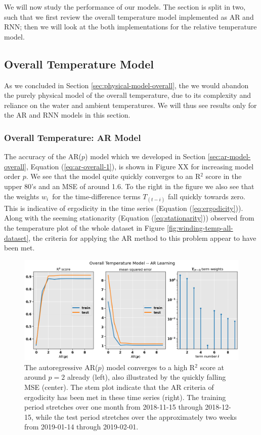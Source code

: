 \documentclass[]{article}
\begin{document}

We will now study the performance of our models. The section is split in two, such that we first review the overall temperature model implemented as AR and RNN; then we will look at the both implementations for the relative temperature model.

\subsection{Overall Temperature Model} \label{sec:results-overall}
As we concluded in Section \ref{sec:physical-model-overall}, the we would abandon the purely physical model of the overall temperature, due to its complexity and reliance on the water and ambient temperatures. We will thus see results only for the AR and RNN models in this section.

\subsubsection{Overall Temperature: AR Model} \label{sec:results-overall-ar}
The accuracy of the AR($p$) model which we developed in Section \ref{sec:ar-model-overall}, Equation (\ref{eq:ar-overall-1}), is shown in Figure XX for increasing model order $p$. We see that the model quite quickly converges to an R$^2$ score in the upper 80's and an MSE of around 1.6. To the right in the figure we also see that the weights $w_i$ for the time-difference terms $T_{(t-i)}$ fall quickly towards zero. This is indicative of ergodicity in the time series (Equation (\ref{eq:ergodicity})). Along with the seeming stationarity (Equation (\ref{eq:stationarity})) observed from the temperature plot of the whole dataset in Figure \ref{fig:winding-temp-all-dataset}, the criteria for applying the AR method to this problem appear to have been met. 

\begin{figure}[!h]
	\centering
	\includegraphics[width=1\linewidth]{./figs/ar-model-learning.png}
	\caption{The autoregressive AR($p$) model converges to a high R$^2$ score at around $p = 2$ already (left), also illustrated by the quickly falling MSE (center). The stem plot indicate that the AR criteria of ergodicity has been met in these time series (right). The training period stretches over one month from 2018-11-15 through 2018-12-15, while the test period stretches over the approximately two weeks from 2019-01-14 through 2019-02-01.}
	\label{fig:ar-model-learning}
\end{figure}
\end{document}
